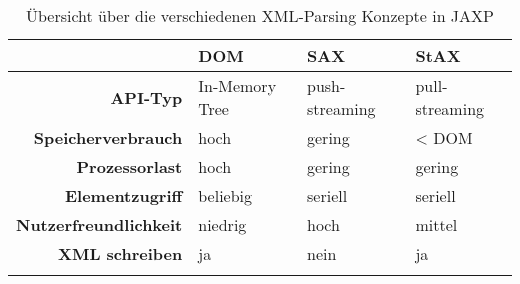 \begin{table}[tb]
    \begin{longtable}[c]{r l l l}
        \toprule
        \rowcolor{lightgray}
        & \textbf{DOM}   & \textbf{SAX}   & \textbf{StAX} \\
        \midrule
        \textbf{API-Typ}                    & In-Memory Tree    & push-streaming    & pull-streaming\\
        \textbf{Speicherverbrauch}          & hoch              & gering            & \textless{} DOM\\
        \textbf{Prozessorlast}              & hoch              & gering            & gering \\
        \textbf{Elementzugriff}             & beliebig          & seriell           & seriell \\
        \textbf{Nutzerfreundlichkeit}       & niedrig           & hoch              & mittel \\
        \textbf{XML schreiben}              & ja                & nein              & ja \\
        \bottomrule
        \caption{Übersicht über die verschiedenen XML-Parsing Konzepte in JAXP}
        \label{tab:xmlParsingModels}
    \end{longtable}
\end{table}
